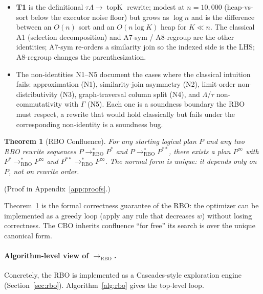 \documentclass[sigconf]{acmart}
\theoremstyle{plain}
\newtheorem{theorem}{Theorem}
\theoremstyle{definition}
\newcommand{\topK}{\operatorname{topK}}
\theoremstyle{remark}
\begin{document}
\begin{itemize}[leftmargin=*, itemsep=0pt]
    (\textbf{M4\,then\,M1}, \textbf{M5\,then\,G1},
    \textbf{M1\,then\,A4-vector}) are the dominant CBO wins on
    Q7 MV. Each is a sequence of two identity applications
    (see the bullet above on composed rewrites); the cost-effect
    is multiplicative: $(1-s_1) \cdot (1-s_2)$ of the work is
    saved.
  \item \textbf{T1} is the definitional $\tau\Lambda \to \topK$
    rewrite; modest at $n = 10{,}000$ (heap-vs-sort below the
    executor noise floor) but grows as $\log n$ and is the
    difference between an $O(n)$ sort and an $O(n \log K)$ heap
    for $K \ll n$. The classical A1 (selection decomposition)
    and A7-sym / A8-regroup are the other identities; A7-sym
    re-orders a similarity join so the indexed side is the LHS;
    A8-regroup changes the parenthesization.
  \item The non-identities N1--N5 document the cases where the
    classical intuition fails: approximation (N1), similarity-join
    asymmetry (N2), limit-order non-distributivity (N3),
    graph-traversal column split (N4), and $\Lambda$/$\tau$ non-
    commutativity with $\Gamma$ (N5). Each one is a soundness
    boundary the RBO must respect, a rewrite that would
    hold classically but fails under the corresponding
    non-identity is a soundness bug.
\end{itemize}


\begin{theorem}[RBO Confluence]\label{thm:rbo-confluence}
For any starting logical plan $P$ and any two RBO rewrite
sequences $P \to^*_{\mathrm{RBO}} P^*$ and
$P \to^*_{\mathrm{RBO}} P^{**}$, there exists a plan $P^\infty$
with $P^* \to^*_{\mathrm{RBO}} P^\infty$ and $P^{**}
\to^*_{\mathrm{RBO}} P^\infty$. The normal form is unique: it
depends only on $P$, not on rewrite order.
\end{theorem}

  (Proof in Appendix~\ref{app:proofs}.)

Theorem~\ref{thm:rbo-confluence} is the formal correctness
guarantee of the RBO: the optimizer can be implemented as a
greedy loop (apply any rule that decreases $w$) without
losing correctness. The CBO inherits confluence ``for free''
its search is over the unique canonical form.


\paragraph{Algorithm-level view of $\to_{\mathrm{RBO}}$.}
Concretely, the RBO is implemented as a Cascades-style
exploration engine
(Section~\ref{sec:rbo}). Algorithm~\ref{alg:rbo} gives the
top-level loop.
\end{document}

